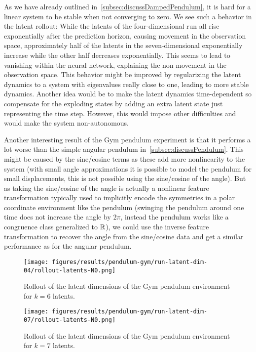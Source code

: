 		As we have already outlined in~\autoref{subsec:discussDampedPendulum}, it is hard for a linear system to be stable when not converging to zero. We see such a behavior in the latent rollout: While the latents of the four-dimensional run all rise exponentially after the prediction horizon, causing movement in the observation space, approximately half of the latents in the seven-dimensional exponentially increase while the other half decreases exponentially. This seems to lead to vanishing within the neural network, explaining the non-movement in the observation space. This behavior might be improved by regularizing the latent dynamics to a system with eigenvalues really close to one, leading to more stable dynamics. Another idea would be to make the latent dynamics time-dependent so compensate for the exploding states by adding an extra latent state just representing the time step. However, this would impose other difficulties and would make the system non-autonomous.

		Another interesting result of the Gym pendulum experiment is that it performs a lot worse than the simple angular pendulum in~\autoref{subsec:discussPendulum}. This might be caused by the sine/cosine terms as these add more nonlinearity to the system (with small angle approximations it is possible to model the pendulum for small displacements, this is not possible using the sine/cosine of the angle). But as taking the sine/cosine of the angle is actually a nonlinear feature transformation typically used to implicitly encode the symmetries in a polar coordinate environment like the pendulum (swinging the pendulum around one time does not increase the angle by \(2\pi\), instead the pendulum works like a congruence class generalized to \(\mathbb{R}\)), we could use the inverse feature transformation to recover the angle from the sine/cosine data and get a similar performance as for the angular pendulum.

		\begin{figure}
			\centering
			\texttt{[image: figures/results/pendulum-gym/run-latent-dim-04/rollout-latents-N0.png]}
			\caption[Latent rollout of the Gym pendulum experiment for 6 latent dimensions]{Rollout of the latent dimensions of the Gym pendulum environment for \( k = 6 \) latents.}
			\label{fig:gymPendulumLatentRolloutL04}
		\end{figure}
		\begin{figure}
			\centering
			\texttt{[image: figures/results/pendulum-gym/run-latent-dim-07/rollout-latents-N0.png]}
			\caption[Latent rollout of the Gym pendulum experiment for 7 latent dimensions]{Rollout of the latent dimensions of the Gym pendulum environment for \( k = 7 \) latents.}
			\label{fig:gymPendulumLatentRolloutL07}
		\end{figure}

